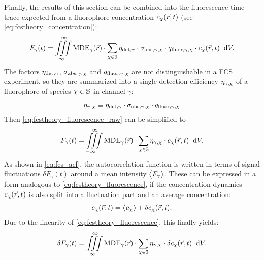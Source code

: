 Finally, the results of this section can be combined into the fluorescence time trace expected from a fluorophore concentration $c_\chi(\vec{r},t)$ (see \eqref{eq:fcstheory_concentration}):
\begin{equation}\label{eq:fcstheory_fluorescence_raw}
  F_\gamma(t)=\fullvolint\MDE_\gamma(\vr)\cdot\sum\limits_{\chi\in\bbS}\etadetgamma\cdot\sigmaabsgammachi\cdot\qfluorgammachi\cdot c_\chi(\vr,t)\;\ddV.%
\end{equation}
The factors $\eta_{{\text{det}},\gamma}$, $\sigma_{{\text{abs}},\gamma,\chi}$ and $q_{{\text{fluor}},\gamma,\chi}$ are not distinguishable in a FCS experiment, so they are summarized into a single detection efficiency $\eta_{\gamma,\chi}$ of a fluorophore of species $\chi\in\mathbb{S}$ in channel $\gamma$:
\begin{equation}\label{eq:fcstheory_etagammachi}
  \eta_{\gamma,\chi}\equiv\eta_{{\text{det}},\gamma}\cdot\sigma_{{\text{abs}},\gamma,\chi}\cdot q_{{\text{fluor}},\gamma,\chi}
\end{equation}
Then \eqref{eq:fcstheory_fluorescence_raw} can be simplified to
\begin{equation}\label{eq:fcstheory_fluorescence}
  F_\gamma(t)=\iiint\limits_{-\infty\ \ }^{\ \ \infty}\operatorname{MDE}_\gamma(\vec{r})\cdot\sum\limits_{\chi\in\mathbb{S}}\eta_{\gamma,\chi}\cdot c_\chi(\vec{r},t)\;\;\mathrm{d}V.
\end{equation}
As shown in \eqref{eq:fcs_acf}, the autocorrelation function is written in terms of signal fluctuations $\delta F_\gamma(t)$ around a mean intensity $\bigl\langle F_\gamma\bigr\rangle$. These can be expressed in a form analogous to \eqref{eq:fcstheory_fluorescence}, if the concentration dynamics $c_\chi(\vec{r},t)$ is also split into a fluctuation part and  an average concentration:%
\begin{equation}\label{eq:fcstheory_concfluc}
  c_\chi(\vec{r},t)=\bigl\langle c_\chi\bigr\rangle+\delta c_\chi(\vec{r},t).
\end{equation}
Due to the linearity of \eqref{eq:fcstheory_fluorescence}, this finally yields:
\begin{equation}\label{eq:fcstheory_fluorescencefluc}
  \delta F_\gamma(t)=\iiint\limits_{-\infty\ \ }^{\ \ \infty}\operatorname{MDE}_\gamma(\vec{r})\cdot\sum\limits_{\chi\in\mathbb{S}}\eta_{\gamma,\chi}\cdot \delta c_\chi(\vec{r},t)\;\;\mathrm{d}V.
\end{equation}



